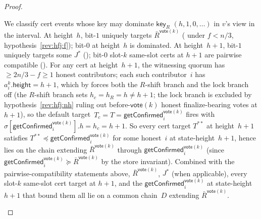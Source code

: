 \documentclass{article}
\newcommand{\height}{\mathsf{height}}
\newcommand{\key}{\mathsf{key}}
\newcommand{\vote}{\mathsf{vote}}
\newcommand{\comm}[1]{\bar{#1}}
\newcommand{\getConfirmed}{\textsf{getConfirmed}\xspace}
\theoremstyle{plain}
\theoremstyle{definition}
\theoremstyle{remark}
\begin{document}
\begin{proof}
\begin{description}
We classify cert events whose key may dominate $\key_R$ $(h, 1, 0, \ldots)$ in $v$'s view in the interval. At height~$h$, bit-$1$ uniquely targets $\comm{R}^{\vote(k)}$ ( under $f<n/3$, hypothesis~\ref{rev:hfj:f}); bit-$0$ at height~$h$ is dominated. At height~$h+1$, bit-$1$ uniquely targets some $J^*$ (); bit-$0$ slot-$k$ same-slot certs at $h+1$ are pairwise compatible (). For any cert at height~$h+1$, the witnessing quorum has $\geq 2n/3 - f \geq 1$ honest contributors; each such contributor~$i$ has $a^k_i.\height = h+1$, which by  forces both the $R$-shift branch and the lock branch off (the $R$-shift branch sets $h_c = h_R = h \neq h+1$; the lock branch is excluded by hypothesis~\ref{rev:hfj:nh} ruling out before-$\vote(k)$ honest finalize-bearing votes at $h+1$), so the default target~$T_c = T = \getConfirmed_i^{\vote(k)}$ fires with $\sigma[\getConfirmed_i^{\vote(k)}].h = h_c = h+1$. So every cert target $T^{**}$ at height~$h+1$ satisfies $T^{**} \preceq \getConfirmed_i^{\vote(k)}$ for some honest~$i$ at state-height~$h+1$, hence lies on the chain extending $\comm{R}^{\vote(k)}$ through $\getConfirmed_i^{\vote(k)}$ (since $\getConfirmed_i^{\vote(k)} \succeq \comm{R}^{\vote(k)}$ by the store invariant). Combined with the pairwise-compatibility statements above, $\comm{R}^{\vote(k)}$, $J^*$ (when applicable), every slot-$k$ same-slot cert target at $h+1$, and the $\getConfirmed_i^{\vote(k)}$ at state-height~$h+1$ that bound them all lie on a common chain~$D$ extending $\comm{R}^{\vote(k)}$.


\end{description}
\end{proof}
\end{document}
